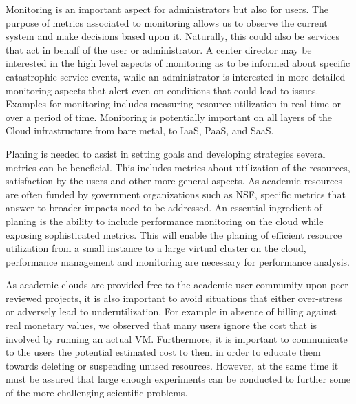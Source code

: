 \documentclass{sig-alternate-05-2015}
\begin{document}
\begin{description}
\setlength\itemsep{-2pt}

\item[\it Monitoring.] Monitoring is an important aspect for
  administrators but also for users. The purpose of metrics associated
  to monitoring allows us to observe the current system and make
  decisions based upon it. Naturally, this could also be services that
  act in behalf of the user or administrator. A center director may be
  interested in the high level aspects of monitoring as to be informed
  about specific catastrophic service events, while an administrator
  is interested in more detailed monitoring aspects that alert even on
  conditions that could lead to issues. Examples for monitoring
  includes measuring resource utilization in real time or over a
  period of time.  Monitoring is potentially important on all layers of
  the Cloud infrastructure from bare metal, to IaaS, PaaS, and SaaS.

\item[\it Planning.] Planing is needed to assist in setting goals and
  developing strategies several metrics can be beneficial. This
  includes metrics about utilization of the resources, satisfaction by
  the users and other more general aspects. As academic resources are
  often funded by government organizations such as NSF, specific
  metrics that answer to broader impacts need to be addressed. An
  essential ingredient of planing is the ability to include
  performance monitoring on the cloud while exposing sophisticated
  metrics.  This will enable the planing of efficient resource
  utilization from a small instance to a large virtual cluster on the
  cloud, performance management and monitoring are necessary for
  performance analysis.

\item[\it  Billing.] As academic clouds are provided free to the academic
  user community upon peer reviewed projects, it is also important to
  avoid situations that either over-stress or adversely lead to
  underutilization. For example in absence of billing against real
  monetary values, we observed that many users ignore the cost that is
  involved by running an actual VM. Furthermore, it is important to
  communicate to the users the potential estimated cost to them in
  order to educate them towards deleting or suspending unused
  resources. However, at the same time it must be assured that large
  enough experiments can be conducted to further some of the more
  challenging scientific problems.


\end{description}
\end{document}
